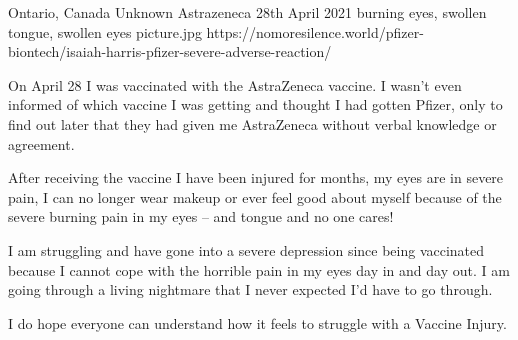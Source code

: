           {Ontario, Canada}
          {Unknown}
          {Astrazeneca}
          {28th April 2021}
          {burning eyes, swollen tongue, swollen eyes}
          {picture.jpg}
          {https://nomoresilence.world/pfizer-biontech/isaiah-harris-pfizer-severe-adverse-reaction/}
          {

On April 28 I was vaccinated with the AstraZeneca vaccine. I wasn’t even
informed of which vaccine I was getting and thought I had gotten Pfizer, only to
find out later that they had given me AstraZeneca without verbal knowledge or
agreement.

After receiving the vaccine I have been injured for months, my eyes are in
severe pain, I can no longer wear makeup or ever feel good about myself because
of the severe burning pain in my eyes – and tongue and no one cares!

I am struggling and have gone into a severe depression since being vaccinated
because I cannot cope with the horrible pain in my eyes day in and day out. I am
going through a living nightmare that I never expected I’d have to go through.

I do hope everyone can understand how it feels to struggle with a Vaccine
Injury.

}
